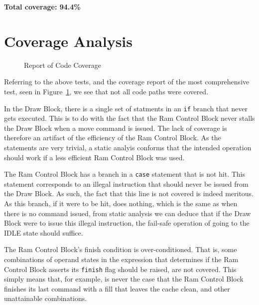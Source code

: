 \documentclass[]{article}
\begin{document}
\textbf{Total coverage: 94.4\%}



\section{Coverage Analysis} %
\label{sec:coverage_analysis}

\begin{figure}[htbp]
	\begin{center}
		
	\end{center}
	\caption{Report of Code Coverage}
	\label{fig:report_of_coverage}
\end{figure}

Referring to the above tests, and the coverage report of the most comprehensive test, seen in Figure~\ref{fig:report_of_coverage}, we see that not all code paths were covered.

In the Draw Block, there is a single set of statments in an \verb"if" branch that never gets executed. This is to do with the fact that the Ram Control Block never stalls the Draw Block when a move command is issued. The lack of coverage is therefore an artifact of the efficiency of the Ram Control Block. As the statements are very trivial, a static analyis conforms that the intended operation should work if a less efficient Ram Control Block was used.

The Ram Control Block has a branch in a \verb"case" statement that is not hit. This statement corresponds to an illegal instruction that should never be issued from the Draw Block. As such, the fact that this line is not covered is indeed meritous. As this branch, if it were to be hit, does nothing, which is the same as when there is no command issued, from static analysis we can deduce that if the Draw Block were to issue this illegal instruction, the fail-safe operation of going to the IDLE state should suffice.

The Ram Control Block's finish condition is over-conditioned. That is, some combinations of operand states in the expression that determines if the Ram Control Block asserts its \verb"finish" flag should be raised, are not covered. This simply means that, for example, is never the case that the Ram Control Block finishes its last command with a fill that leaves the cache clean, and other unattainable combinations.
\end{document}
